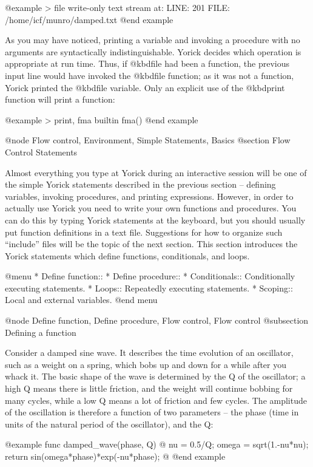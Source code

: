 {@example
> file
write-only text stream at:
  LINE: 201  FILE: /home/icf/munro/damped.txt
@end example

As you may have noticed, printing a variable and invoking a procedure
with no arguments are syntactically indistinguishable.  Yorick decides
which operation is appropriate at run time.  Thus, if @kbd{file} had
been a function, the previous input line would have invoked the
@kbd{file} function; as it was not a function, Yorick printed the
@kbd{file} variable.  Only an explicit use of the @kbd{print} function
will print a function:

@example
> print, fma
builtin fma()
@end example


@node Flow control, Environment, Simple Statements, Basics
@section Flow Control Statements

Almost everything you type at Yorick during an interactive session
will be one of the simple Yorick statements described in the previous
section -- defining variables, invoking procedures, and printing
expressions.  However, in order to actually use Yorick you need to
write your own functions and procedures.  You can do this by typing
Yorick statements at the keyboard, but you should usually put function
definitions in a text file.  Suggestions for how to organize such
``include'' files will be the topic of the next section.  This section
introduces the Yorick statements which define functions, conditionals,
and loops.


@menu
* Define function::             
* Define procedure::            
* Conditionals::                Conditionally executing statements.
* Loops::                       Repeatedly executing statements. 
* Scoping::                     Local and external variables.
@end menu

@node Define function, Define procedure, Flow control, Flow control
@subsection Defining a function

Consider a damped sine wave.  It describes the time evolution of an
oscillator, such as a weight on a spring, which bobs up and down for a
while after you whack it.  The basic shape of the wave is determined
by the Q of the oscillator; a high Q means there is little friction,
and the weight will continue bobbing for many cycles, while a low Q
means a lot of friction and few cycles.  The amplitude of the
oscillation is therefore a function of two parameters -- the phase
(time in units of the natural period of the oscillator), and the Q:

@example
func damped_wave(phase, Q)
@{
  nu = 0.5/Q;
  omega = sqrt(1.-nu*nu);
  return sin(omega*phase)*exp(-nu*phase);
@}
@end example

}
